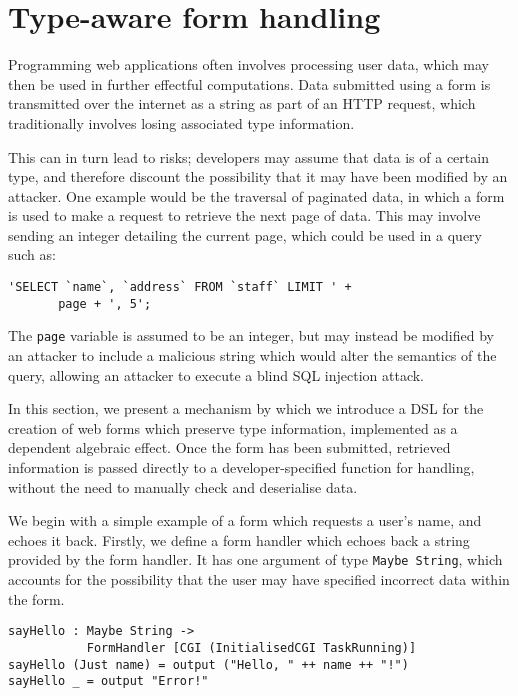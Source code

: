 \section{Type-aware form handling}

\label{form}
Programming web applications often involves processing user data, which may
then be used in further effectful computations. Data submitted using a form is
transmitted over the internet as a string as part of an HTTP request, which
traditionally involves losing associated type information.

This can in turn lead to risks; developers may assume that data is
of a certain type, and therefore discount the possibility that it may have been
modified by an attacker. One example would be the traversal of paginated data,
in which a form is used to make a request to retrieve the next page of data.
This may involve sending an integer detailing the current page, which could be
used in a query such as:

\begin{Verbatim}
'SELECT `name`, `address` FROM `staff` LIMIT ' + 
       page + ', 5';
\end{Verbatim}
The \texttt{page} variable is assumed to be an integer, but may instead be
modified by an attacker to include a malicious string which would alter the
semantics of the query, allowing an attacker to execute a blind SQL injection
attack. %

In this section, we present a mechanism by which we introduce a DSL
for the creation of web forms which preserve type information, implemented
as a dependent algebraic effect. Once the form has
been submitted, retrieved information is passed directly to a
developer-specified function for handling, without the need to manually check
and deserialise data. 

We begin with a simple example of a form which requests a user's name, and
echoes it back. Firstly, we define a form handler which echoes back a string
provided by the form handler. It has one argument of type \texttt{Maybe
String}, which accounts for the possibility that the user may have specified
incorrect data within the form.

\begin{Verbatim}
sayHello : Maybe String -> 
           FormHandler [CGI (InitialisedCGI TaskRunning)]
sayHello (Just name) = output ("Hello, " ++ name ++ "!")
sayHello _ = output "Error!"
\end{Verbatim}

